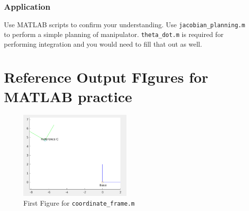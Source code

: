 \documentclass[letterpaper]{article}
\begin{document}
\subsubsection{Application}
Use MATLAB scripts to confirm your understanding. Use \texttt{jacobian\_planning.m}
to perform a simple planning of manipulator. \texttt{theta\_dot.m} is required for performing integration
and you would need to fill that out as well.

\pagebreak
\appendix
\section{Reference Output FIgures for MATLAB practice}
\begin{figure}[h]
  \centering
  \includegraphics[width=0.5\textwidth]{figs/coor-1.png}
  \caption{First Figure for \texttt{coordinate\_frame.m}}
\end{figure}
\end{document}
